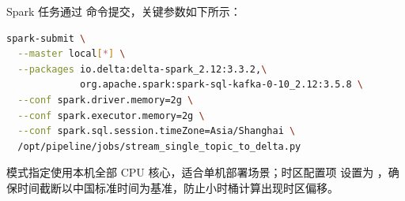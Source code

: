 Spark 任务通过  命令提交，关键参数如下所示：

\begin{lstlisting}[language=bash, caption={spark-submit 关键参数}, label={lst:submit}]
spark-submit \
  --master local[*] \
  --packages io.delta:delta-spark_2.12:3.3.2,\
             org.apache.spark:spark-sql-kafka-0-10_2.12:3.5.8 \
  --conf spark.driver.memory=2g \
  --conf spark.executor.memory=2g \
  --conf spark.sql.session.timeZone=Asia/Shanghai \
  /opt/pipeline/jobs/stream_single_topic_to_delta.py
\end{lstlisting}

\code{local[*]} 模式指定使用本机全部 CPU 核心，适合单机部署场景；时区配置项  设置为 ，确保时间截断以中国标准时间为基准，防止小时桶计算出现时区偏移。

